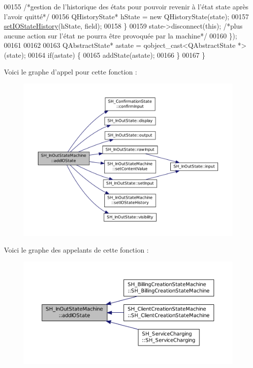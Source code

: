 \begin{DoxyCode}
00155             \textcolor{comment}{/*gestion de l'historique des états pour pouvoir revenir à l'état state après l'avoir quitté*/}
00156             QHistoryState* hState = \textcolor{keyword}{new} QHistoryState(state);
00157             \hyperlink{classSH__InOutStateMachine_a4b72e6da839782a211692a4d728c3925}{setIOStateHistory}(hState, field);
00158         \}
00159         state->disconnect(\textcolor{keyword}{this}); \textcolor{comment}{/*plus aucune action sur l'état ne pourra être provoquée par la machine*/}
00160     \});
00161 
00162 
00163     QAbstractState* astate = qobject\_cast<QAbstractState *>(state);
00164     \textcolor{keywordflow}{if}(astate) \{
00165         addState(astate);
00166     \}
00167 \}
\end{DoxyCode}


Voici le graphe d'appel pour cette fonction \-:\nopagebreak
\begin{figure}[H]
\begin{center}
\leavevmode
\includegraphics[width=350pt]{classSH__InOutStateMachine_ad6b778d052f741daee720c047059ce0e_cgraph}
\end{center}
\end{figure}




Voici le graphe des appelants de cette fonction \-:\nopagebreak
\begin{figure}[H]
\begin{center}
\leavevmode
\includegraphics[width=350pt]{classSH__InOutStateMachine_ad6b778d052f741daee720c047059ce0e_icgraph}
\end{center}
\end{figure}



